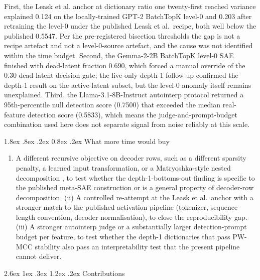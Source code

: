 \documentclass[conference]{IEEEtran}
\makeatletter
\renewcommand\section{\@startsection{section}{1}{\z@}%
   {2.6ex \@plus 1ex \@minus .3ex}%
   {1.2ex \@plus .2ex}%
   {\normalfont\Large\bfseries\centering}}
\renewcommand\subsection{\@startsection{subsection}{2}{\z@}%
   {1.8ex \@plus .8ex \@minus .2ex}%
   {0.8ex \@plus .2ex}%
   {\normalfont\large\bfseries}}
\providecommand{\tightlist}{%
  \setlength{\itemsep}{0pt}\setlength{\parskip}{0pt}}
\makeatother
\begin{document}
First, the Leask et al. \autocite{leask2025sparse} anchor at dictionary
ratio one twenty-first reached variance explained 0.124 on the
locally-trained GPT-2 BatchTopK level-0 and 0.203 after retraining the
level-0 under the published Leask et al.~recipe, both well below the
published 0.5547. Per the pre-registered bisection thresholds the gap is
not a recipe artefact and not a level-0-source artefact, and the cause
was not identified within the time budget. Second, the Gemma-2-2B
BatchTopK level-0 SAE finished with dead-latent fraction 0.690, which
forced a manual override of the 0.30 dead-latent decision gate; the
live-only depth-1 follow-up confirmed the depth-1 result on the
active-latent subset, but the level-0 anomaly itself remains
unexplained. Third, the Llama-3.1-8B-Instruct autointerp protocol
returned a 95th-percentile null detection score (0.7500) that exceeded
the median real-feature detection score (0.5833), which means the
judge-and-prompt-budget combination used here does not separate signal
from noise reliably at this scale.

\hypertarget{what-more-time-would-buy}{%
\subsection{What more time would buy}\label{what-more-time-would-buy}}

\begin{enumerate}
\def\labelenumi{(\roman{enumi})}
\tightlist
\item
  A different recursive objective on decoder rows, such as a different
  sparsity penalty, a learned input transformation, or a
  Matryoshka-style nested decomposition \autocite{bussmann2025learning},
  to test whether the depth-1-bottoms-out finding is specific to the
  published meta-SAE construction or is a general property of
  decoder-row decomposition. (ii) A controlled re-attempt at the Leask
  et al.~anchor with a stronger match to the published activation
  pipeline (tokenizer, sequence-length convention, decoder
  normalisation), to close the reproducibility gap. (iii) A stronger
  autointerp judge or a substantially larger detection-prompt budget per
  feature, to test whether the depth-1 dictionaries that pass PW-MCC
  stability also pass an interpretability test that the present pipeline
  cannot deliver.
\end{enumerate}

\hypertarget{contributions}{%
\section{Contributions}\label{contributions}}
\end{document}
